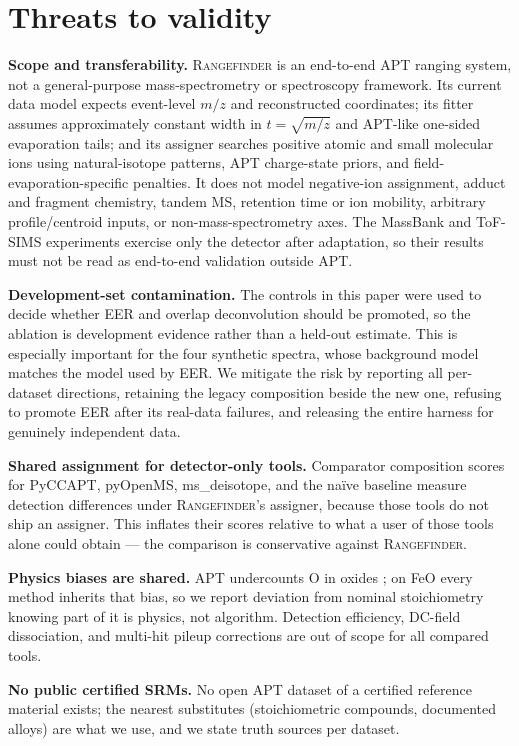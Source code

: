 \documentclass[11pt]{article}
\newcommand{\rf}{\textsc{Rangefinder}}
\begin{document}
\section{Threats to validity}
\label{sec:threats}

\textbf{Scope and transferability.} \rf{} is an end-to-end APT ranging
system, not a general-purpose mass-spectrometry or spectroscopy framework.
Its current data model expects event-level $m/z$ and reconstructed
coordinates; its fitter assumes approximately constant width in
$t=\sqrt{m/z}$ and APT-like one-sided evaporation tails; and its assigner
searches positive atomic and small molecular ions using natural-isotope
patterns, APT charge-state priors, and field-evaporation-specific penalties.
It does not model negative-ion assignment, adduct and fragment chemistry,
tandem MS, retention time or ion mobility, arbitrary profile/centroid
inputs, or non-mass-spectrometry axes. The MassBank and ToF-SIMS experiments
exercise only the detector after adaptation, so their results must not be
read as end-to-end validation outside APT.

\textbf{Development-set contamination.} The controls in this paper were
used to decide whether EER and overlap deconvolution should be promoted, so
the ablation is development evidence rather than a held-out estimate. This
is especially important for the four synthetic spectra, whose background
model matches the model used by EER. We mitigate the risk by reporting all
per-dataset directions, retaining the legacy composition beside the new
one, refusing to promote EER after its real-data failures, and releasing the
entire harness for genuinely independent data.

\textbf{Shared assignment for detector-only tools.} Comparator
composition scores for PyCCAPT, pyOpenMS, ms\_deisotope, and the na\"ive
baseline measure detection differences under \rf{}'s assigner, because
those tools do not ship an assigner. This inflates their scores relative
to what a user of those tools alone could obtain --- the comparison is
conservative against \rf{}.

\textbf{Physics biases are shared.} APT undercounts O in oxides
\citep{gault2021primer}; on FeO every method inherits that bias, so we
report deviation from nominal stoichiometry knowing part of it is
physics, not algorithm. Detection efficiency, DC-field dissociation, and
multi-hit pileup corrections are out of scope for all compared tools.

\textbf{No public certified SRMs.} No open APT dataset of a certified
reference material exists; the nearest substitutes (stoichiometric
compounds, documented alloys) are what we use, and we state truth
sources per dataset.
\end{document}
